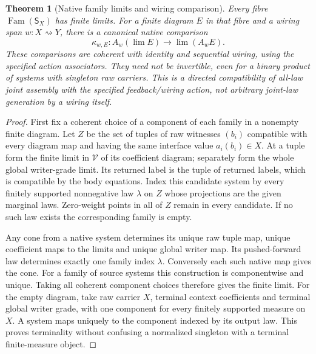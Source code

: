 \documentclass{article}
\newtheorem{theorem}{Theorem}
\begin{document}
\begin{theorem}[Native family limits and wiring comparison]
Every fibre $\operatorname{Fam}(\mathsf S_X)$ has finite limits. For a finite diagram $E$ in that fibre and a wiring span $w:X\rightsquigarrow Y$, there is a canonical native comparison
\[\kappa_{w,E}:A_w(\lim E)\longrightarrow\lim(A_w E).\tag{K}\]
These comparisons are coherent with identity and sequential wiring, using the specified action associators. They need not be invertible, even for a binary product of systems with singleton raw carriers. This is a directed compatibility of all-law joint assembly with the specified feedback/wiring action, not arbitrary joint-law generation by a wiring itself.
\end{theorem}
\begin{proof}
First fix a coherent choice of a component of each family in a nonempty finite diagram. Let $Z$ be the set of tuples of raw witnesses $(b_i)$ compatible with every diagram map and having the same interface value $a_i(b_i)\in X$. At a tuple form the finite limit in $\mathcal V$ of its coefficient diagram; separately form the whole global writer-grade limit. Its returned label is the tuple of returned labels, which is compatible by the body equations. Index this candidate system by every finitely supported nonnegative law $\lambda$ on $Z$ whose projections are the given marginal laws. Zero-weight points in all of $Z$ remain in every candidate. If no such law exists the corresponding family is empty.

Any cone from a native system determines its unique raw tuple map, unique coefficient maps to the limits and unique global writer map. Its pushed-forward law determines exactly one family index $\lambda$. Conversely each such native map gives the cone. For a family of source systems this construction is componentwise and unique. Taking all coherent component choices therefore gives the finite limit. For the empty diagram, take raw carrier $X$, terminal context coefficients and terminal global writer grade, with one component for every finitely supported measure on $X$. A system maps uniquely to the component indexed by its output law. This proves terminality without confusing a normalized singleton with a terminal finite-measure object.


\end{proof}
\end{document}
